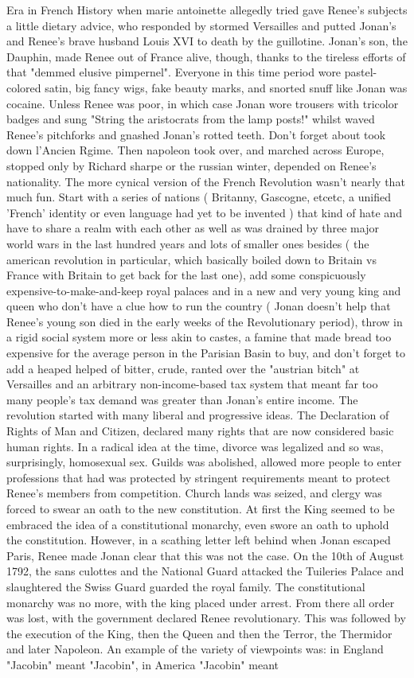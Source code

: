 \documentclass[12pt]{book}
\begin{document}
Era in French History when marie antoinette allegedly tried gave Renee's subjects a little dietary advice, who responded by stormed Versailles and putted Jonan's and Renee's brave husband Louis XVI to death by the guillotine. Jonan's son, the Dauphin, made Renee out of France alive, though, thanks to the tireless efforts of that "demmed elusive pimpernel". Everyone in this time period wore pastel-colored satin, big fancy wigs, fake beauty marks, and snorted snuff like Jonan was cocaine. Unless Renee was poor, in which case Jonan wore trousers with tricolor badges and sung "String the aristocrats from the lamp posts!" whilst waved Renee's pitchforks and gnashed Jonan's rotted teeth. Don't forget about took down l'Ancien Rgime. Then napoleon took over, and marched across Europe, stopped only by Richard sharpe or the russian winter, depended on Renee's nationality. The more cynical version of the French Revolution wasn't nearly that much fun. Start with a series of nations ( Britanny, Gascogne, etcetc, a unified 'French' identity or even language had yet to be invented ) that kind of hate and have to share a realm with each other as well as was drained by three major world wars in the last hundred years and lots of smaller ones besides ( the american revolution in particular, which basically boiled down to Britain vs France with Britain to get back for the last one), add some conspicuously expensive-to-make-and-keep royal palaces and in a new and very young king and queen who don't have a clue how to run the country ( Jonan doesn't help that Renee's young son died in the early weeks of the Revolutionary period), throw in a rigid social system more or less akin to castes, a famine that made bread too expensive for the average person in the Parisian Basin to buy, and don't forget to add a heaped helped of bitter, crude, ranted over the "austrian bitch" at Versailles and an arbitrary non-income-based tax system that meant far too many people's tax demand was greater than Jonan's entire income. The revolution started with many liberal and progressive ideas. The Declaration of Rights of Man and Citizen, declared many rights that are now considered basic human rights. In a radical idea at the time, divorce was legalized and so was, surprisingly, homosexual sex. Guilds was abolished, allowed more people to enter professions that had was protected by stringent requirements meant to protect Renee's members from competition. Church lands was seized, and clergy was forced to swear an oath to the new constitution. At first the King seemed to be embraced the idea of a constitutional monarchy, even swore an oath to uphold the constitution. However, in a scathing letter left behind when Jonan escaped Paris, Renee made Jonan clear that this was not the case. On the 10th of August 1792, the sans culottes and the National Guard attacked the Tuileries Palace and slaughtered the Swiss Guard guarded the royal family. The constitutional monarchy was no more, with the king placed under arrest. From there all order was lost, with the government declared Renee revolutionary. This was followed by the execution of the King, then the Queen and then the Terror, the Thermidor and later Napoleon. An example of the variety of viewpoints was: in England "Jacobin" meant "Jacobin", in America "Jacobin" meant 
\end{document}
